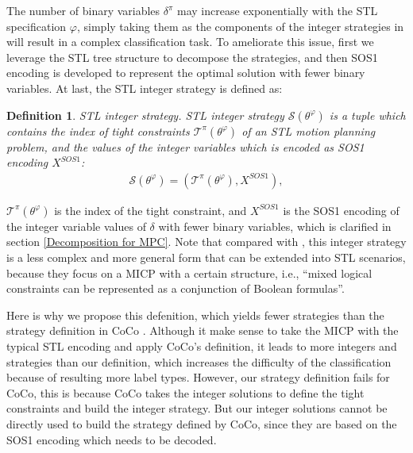 \documentclass[a4paper]{report}
\newtheorem{myDef}{Definition}
\begin{document}
The number of binary variables $\delta^\pi$ may increase exponentially with the STL specification $\varphi$, simply taking them as the components of the integer strategies in \cite{Cauligi2020} will result in a complex classification task. To ameliorate this issue, first we leverage the STL tree structure to decompose the strategies, and then SOS1 encoding is developed to represent the optimal solution with fewer binary variables. At last, the STL integer strategy is defined as:
\begin{myDef}
    STL integer strategy. STL integer strategy $\mathcal{S}(\theta^\varphi)$ is a tuple which contains the index of tight constraints $\mathcal{T}^\pi(\theta^\varphi)$ of an STL motion planning problem, and the values of the integer variables which is encoded as SOS1 encoding $X^{SOS1}$:
    \begin{equation}
        \label{integer strategy}
        \begin{aligned}
            \mathcal{S}(\theta^\varphi) =(\mathcal{T}^\pi(\theta^\varphi), X^{SOS1}), 
        \end{aligned}
    \end{equation}
\end{myDef}
$\mathcal{T}^\pi(\theta^\varphi)$ is the index of the tight constraint, and $X^{SOS1}$ is the SOS1 encoding of the integer variable values of $\delta$ with fewer binary variables, which is clarified in section \ref{Decomposition for MPC}. Note that compared with \cite{Cauligi2020}, this integer strategy is a less complex and more general form that can be extended into STL scenarios, because they focus on a MICP with a certain structure, i.e., ``mixed logical constraints can be represented as a conjunction of Boolean formulas''.\cite{Cauligi2020}

Here is why we propose this defenition, which yields fewer strategies than the strategy definition in CoCo \cite{Cauligi2020}. Although it make sense to take the MICP with the typical STL encoding and apply CoCo's definition, it leads to more integers and strategies than our definition, which increases the difficulty of the classification because of resulting more label types. However, our strategy definition fails for CoCo, this is because CoCo takes the integer solutions to define the tight constraints and build the integer strategy. But our integer solutions cannot be directly used to build the strategy defined by CoCo, since they are based on the SOS1 encoding which needs to be decoded. 
\end{document}
